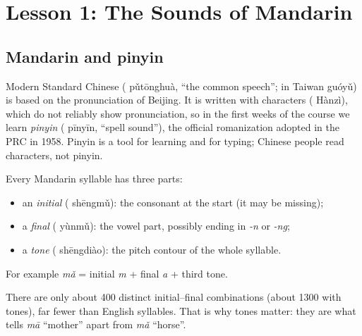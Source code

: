 \chapter{Lesson 1: The Sounds of Mandarin}

\section{Mandarin and pinyin}

Modern Standard Chinese ( pǔtōnghuà, ``the common speech''; in Taiwan
 guóyǔ) is based on the pronunciation of Beijing. It is written with
characters ( Hànzì), which do not reliably show pronunciation, so in the
first weeks of the course we learn \emph{pinyin} ( pīnyīn, ``spell sound''),
the official romanization adopted in the PRC in 1958. Pinyin is a tool for learning and
for typing; Chinese people read characters, not pinyin.

\begin{definition}
Every Mandarin syllable has three parts:
\begin{itemize}
  \item an \emph{initial} ( shēngmǔ): the consonant at the start (it may be
        missing);
  \item a \emph{final} ( yùnmǔ): the vowel part, possibly ending in
        \emph{-n} or \emph{-ng};
  \item a \emph{tone} ( shēngdiào): the pitch contour of the whole syllable.
\end{itemize}
For example \emph{mǎ} = initial \emph{m} + final \emph{a} + third tone.
\end{definition}

There are only about 400 distinct initial--final combinations (about 1300 with tones),
far fewer than English syllables. That is why tones matter: they are what tells
\emph{mā} ``mother'' apart from \emph{mǎ} ``horse''.

\begin{center}
\end{center}

